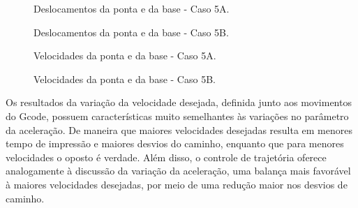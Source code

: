 \begin{figure}[H]
    \centering
    \hfill
    \caption{Deslocamentos da ponta e da base - Caso 5A.}
    \label{fig:5A_des}
\end{figure}

\begin{figure}[H]
    \centering
    \hfill
    \caption{Deslocamentos da ponta e da base - Caso 5B.}
    \label{fig:5B_des}
\end{figure}

\begin{figure}[H]
    \centering
    \hfill
    \caption{Velocidades da ponta e da base - Caso 5A.}
    \label{fig:5A_vel}
\end{figure}

\begin{figure}[H]
    \centering
    \hfill
    \caption{Velocidades da ponta e da base - Caso 5B.}
    \label{fig:5B_vel}
\end{figure}

Os resultados da variação da velocidade desejada, definida junto aos movimentos do Gcode, possuem características muito semelhantes às variações no parâmetro da aceleração. De maneira que maiores velocidades desejadas resulta em menores tempo de impressão e maiores desvios do caminho, enquanto que para menores velocidades o oposto é verdade. Além disso, o controle de trajetória oferece analogamente à discussão da variação da aceleração, uma balança mais favorável à maiores velocidades desejadas, por meio de uma redução maior nos desvios de caminho.

